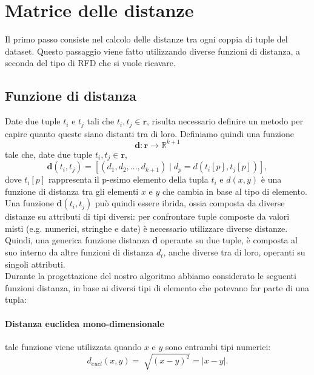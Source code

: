 \section{Matrice delle distanze}
Il primo passo consiste nel calcolo delle distanze tra ogni coppia di tuple del dataset. Questo passaggio viene fatto utilizzando diverse funzioni di distanza, a seconda del tipo di RFD che si vuole ricavare.
\subsection{Funzione di distanza}
Date due tuple $t_i$ e $t_j$ tali che $t_i, t_j \in \mathbf{r}$, risulta necessario definire un metodo per capire quanto queste siano distanti tra di loro. Definiamo quindi una funzione 
$$ \mathbf{d}: \mathbf{r} \rightarrow \mathbb{R}^{k+1} $$
tale che, date due tuple $t_i , t_j \in \mathbf{r}$, 
$$ \mathbf{d}(t_i, t_j) = [(d_1, d_2,..., d_{k+1}) \mid d_p = d(t_i[p], t_j[p])  ], $$
dove $t_i[p]$ rappresenta il p-esimo elemento della tupla $t_i$ e $d(x,y)$ è una funzione di distanza tra gli elementi $x$ e $y$ che cambia in base al tipo di elemento. \\
Una funzione $\mathbf{d}(t_i, t_j)$ può quindi essere ibrida, ossia composta da diverse distanze su attributi di tipi diversi: per confrontare tuple composte da valori misti (e.g. numerici, stringhe e date) è necessario utilizzare diverse distanze. Quindi, una generica funzione distanza $\mathbf{d}$ operante su due tuple, è composta al suo interno da altre funzioni di distanza $d_{t}$, anche diverse tra di loro, operanti su singoli attributi.\\
Durante la progettazione del nostro algoritmo abbiamo considerato le seguenti funzioni distanza, in base ai diversi tipi di elemento che potevano far parte di una tupla:
\paragraph{Distanza euclidea mono-dimensionale} tale funzione viene utilizzata quando $x$ e $y$ sono entrambi tipi numerici:
\begin{equation}
	d_{eucl}(x,y) = \sqrt[]{(x-y)^{2}} = |x - y|.
\end{equation}
